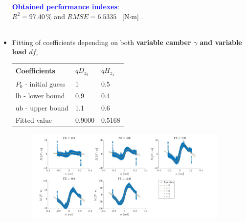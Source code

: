 \documentclass{IEEEtran}
\begin{document}
\begin{itemize}
                
                \textbf{\textcolor{blue}{Obtained performance indexes}}: \\ $R^{2} = 97.40 \, \%$ and $RMSE = 6.5335 $ \, [N$\cdot$m] . \\\\

            
                
            \item Fitting of coefficients depending on both \textbf{variable camber $\gamma$ and variable load $df_z$}
            
                \begin{table}[htbp]
                    \begin{center}
                    \begin{tabular}{|l|l|l|}  
                        \hline
                        Coefficients & $qD_{z_9}$ & $qH_{z_4}$ \\
                        \hline
                        $P_0$ - initial guess & 1 & 0.5\\ \hline
                        lb - lower bound   & 0.9 & 0.4 \\ 
                        \hline
                        ub - upper bound   & 1.1 & 0.6 \\ 
                        \hline
                        Fitted value & 0.9000 & 0.5168 \\
                        \hline
                    \end{tabular}
                    \end{center}
                \end{table}
                
            
                \begin{figure}[htbp]
                    \centerline{\includegraphics[width = 3.95in]{moment_4.jpg}}
                    
                    \label{fig:MZ_camber_dfz}
                \end{figure}
            \end{itemize}
            
\end{document}

